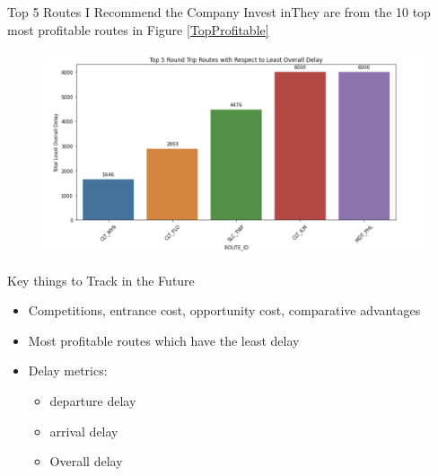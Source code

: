 \documentclass[aspectratio=1610]{beamer}
\begin{document}
\begin{frame}{Top 5 Routes I Recommend the Company Invest in}{They are from the 10 top most profitable routes in Figure \ref{TopProfitable}}
	\begin{figure}[htp!]
		\begin{center}
			\includegraphics[height=6cm, width= 12cm]{Top5Recom} 
			\caption{}
			\label{Top5Recom}
		\end{center}
	\end{figure}
\end{frame}

\begin{frame}{Key things to Track in the Future}
	\begin{itemize}
		\item Competitions, entrance cost, opportunity cost, comparative advantages
		\item Most profitable routes which have the least delay
		\item Delay metrics:
		\begin{itemize}
			\item departure delay
			\item arrival delay
			\item Overall delay
		\end{itemize}
	\end{itemize}
\end{frame}
\end{document}
